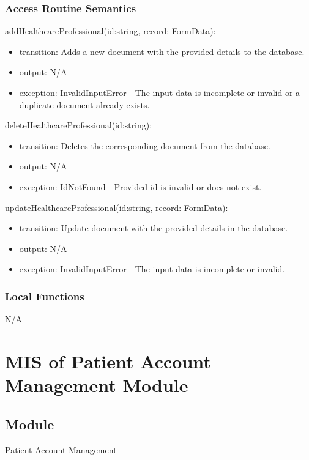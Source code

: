 \documentclass[12pt, titlepage]{article}
\begin{document}
\subsubsection{Access Routine Semantics}

\noindent addHealthcareProfessional(id:string, record: FormData):
\begin{itemize}
\item transition: Adds a new document with the provided details to the database.
\item output: N/A
\item exception: InvalidInputError - The input data is incomplete or invalid or a duplicate document already exists.
\end{itemize}

\noindent deleteHealthcareProfessional(id:string):
\begin{itemize}
\item transition: Deletes the corresponding document from the database.
\item output: N/A
\item exception: IdNotFound - Provided id is invalid or does not exist.
\end{itemize}

\noindent updateHealthcareProfessional(id:string, record: FormData):
\begin{itemize}
\item transition: Update document with the provided details in the database.
\item output: N/A
\item exception: InvalidInputError - The input data is incomplete or invalid.
\end{itemize}

\subsubsection{Local Functions}

N/A

\newpage

\section{MIS of Patient Account Management Module} \label{Patient_Account_Manag_Module}

\subsection{Module}
Patient Account Management
\end{document}
